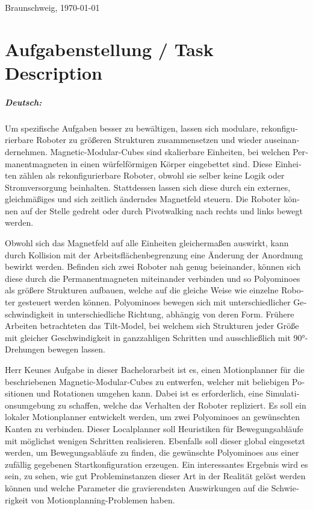\documentclass[11pt,a4paper,twoside,titlepage]{scrbook}
\theoremstyle{definition}
\begin{document}
	\par
	\vspace{1cm}
	\bigskip\noindent Braunschweig, \today \par
	\vspace*{10mm}
	\hfill\hrulefill
	\clearpage
	
	
	\chapter*{Aufgabenstellung / Task Description}


\paragraph{Deutsch:}
\begin{otherlanguage}{ngerman}
	Um spezifische Aufgaben besser zu bewältigen, lassen sich modulare, rekonfigurierbare Roboter zu größeren Strukturen zusammensetzen und wieder auseinandernehmen.
	Magnetic-Modular-Cubes sind skalierbare Einheiten, bei welchen Permanentmagneten in einen würfelförmigen Körper eingebettet sind.
	Diese Einheiten zählen als rekonfigurierbare Roboter, obwohl sie selber keine Logik oder Stromversorgung beinhalten.
	Stattdessen lassen sich diese durch ein externes, gleichmäßiges und sich zeitlich änderndes Magnetfeld steuern.
	Die Roboter können auf der Stelle gedreht oder durch Pivotwalking nach rechts und links bewegt werden.
	
	Obwohl sich das Magnetfeld auf alle Einheiten gleichermaßen auswirkt, kann durch Kollision mit der Arbeitsflächenbegrenzung eine Änderung der Anordnung bewirkt werden.
	Befinden sich zwei Roboter nah genug beieinander, können sich diese durch die Permanentmagneten miteinander verbinden und so Polyominoes als größere Strukturen aufbauen, welche auf die gleiche Weise wie einzelne Roboter gesteuert werden können.
	Polyominoes bewegen sich mit unterschiedlicher Geschwindigkeit in unterschiedliche Richtung, abhängig von deren Form.
	Frühere Arbeiten betrachteten das Tilt-Model, bei welchem sich Strukturen jeder Größe mit gleicher Geschwindigkeit in ganzzahligen Schritten und ausschließlich mit 90°-Drehungen bewegen lassen.
	
	Herr Keunes Aufgabe in dieser Bachelorarbeit ist es, einen Motionplanner für die beschriebenen Magnetic-Modular-Cubes zu entwerfen, welcher mit beliebigen Positionen und Rotationen umgehen kann.
	Dabei ist es erforderlich, eine Simulationsumgebung zu schaffen, welche das Verhalten der Roboter repliziert.
	Es soll ein lokaler Motionplanner entwickelt werden, um zwei Polyominoes an gewünschten Kanten zu verbinden.
	Dieser Localplanner soll Heuristiken für Bewegungsabläufe mit möglichst wenigen Schritten realisieren.
	Ebenfalls soll dieser global eingesetzt werden, um Bewegungsabläufe zu finden, die gewünschte Polyominoes aus einer zufällig gegebenen Startkonfiguration erzeugen.
	Ein interessantes Ergebnis wird es sein, zu sehen, wie gut Probleminstanzen dieser Art in der Realität gelöst werden können und welche Parameter die gravierendsten Auswirkungen auf die Schwierigkeit von Motionplanning-Problemen haben.
	
\end{otherlanguage}
\end{document}

